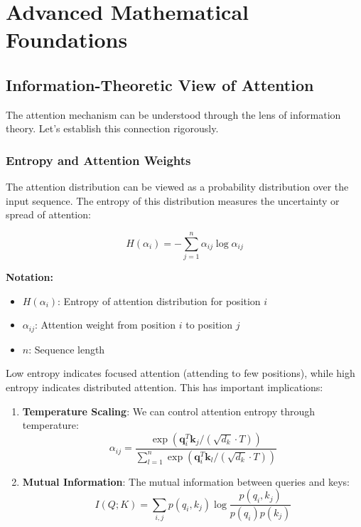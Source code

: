 
\section{Advanced Mathematical Foundations}

\subsection{Information-Theoretic View of Attention}

The attention mechanism can be understood through the lens of information theory. Let's establish this connection rigorously.

\subsubsection{Entropy and Attention Weights}

The attention distribution can be viewed as a probability distribution over the input sequence. The entropy of this distribution measures the uncertainty or spread of attention:

\begin{equation}
H(\alpha_i) = -\sum_{j=1}^{n} \alpha_{ij} \log \alpha_{ij}
\end{equation}

\begin{notationbox}
\textbf{Notation:}
\begin{itemize}
    \item $H(\alpha_i)$: Entropy of attention distribution for position $i$
    \item $\alpha_{ij}$: Attention weight from position $i$ to position $j$
    \item $n$: Sequence length
\end{itemize}
\end{notationbox}

Low entropy indicates focused attention (attending to few positions), while high entropy indicates distributed attention. This has important implications:

\begin{enumerate}
    \item \textbf{Temperature Scaling}: We can control attention entropy through temperature:
    \begin{equation}
    \alpha_{ij} = \frac{\exp(\mathbf{q}_i^T \mathbf{k}_j / (\sqrt{d_k} \cdot T))}{\sum_{l=1}^{n} \exp(\mathbf{q}_i^T \mathbf{k}_l / (\sqrt{d_k} \cdot T))}
    \end{equation}

    \item \textbf{Mutual Information}: The mutual information between queries and keys:
    \begin{equation}
    I(Q; K) = \sum_{i,j} p(q_i, k_j) \log \frac{p(q_i, k_j)}{p(q_i)p(k_j)}
    \end{equation}
\end{enumerate}

